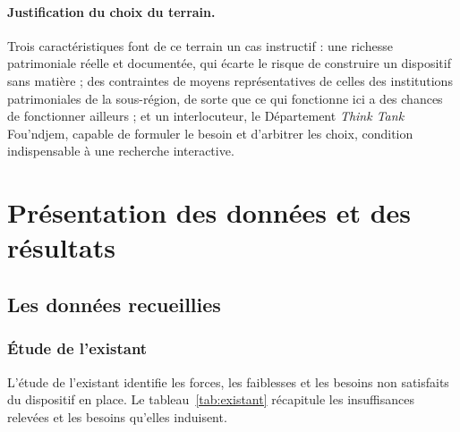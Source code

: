 \paragraph{Justification du choix du terrain.} Trois caractéristiques font de
ce terrain un cas instructif : une richesse patrimoniale réelle et documentée,
qui écarte le risque de construire un dispositif sans matière ; des contraintes
de moyens représentatives de celles des institutions patrimoniales de la
sous-région, de sorte que ce qui fonctionne ici a des chances de fonctionner
ailleurs ; et un interlocuteur, le Département \emph{Think Tank} Fou'ndjem,
capable de formuler le besoin et d'arbitrer les choix, condition indispensable à
une recherche interactive.

\section{Présentation des données et des résultats}
\label{sec:donnees}

\subsection{Les données recueillies}

\subsubsection{Étude de l'existant}

L'étude de l'existant identifie les forces, les faiblesses et les besoins non
satisfaits du dispositif en place. Le tableau~\ref{tab:existant} récapitule les
insuffisances relevées et les besoins qu'elles induisent.

